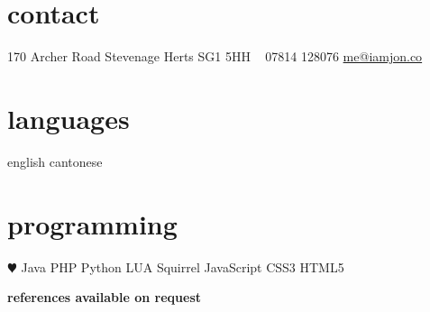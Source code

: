 \documentclass[]{jon-cv}
\begin{document}


\begin{aside} %
\section{contact}
170 Archer Road
Stevenage
Herts
SG1 5HH
~
07814 128076
\href{mailto:me@iamjon.co}{me@iamjon.co}
\section{languages}
english
cantonese
\section{programming}
{\color{red} $\varheartsuit$} Java
PHP
Python
LUA
Squirrel
JavaScript
CSS3
HTML5
\end{aside}






\textbf{\LARGE references available on request}
\end{document}
